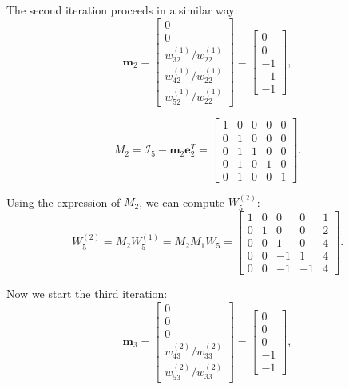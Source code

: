 \documentclass[a4paper,11pt]{article}
\begin{document}
The second iteration proceeds in a similar way:
\begin{equation}\label{key}
	\textbf{m}_2 = 
	\begin{bmatrix}
		0\\
		0\\
		{w^{(1)}_{32}}/{w^{(1)}_{22}}\\
		{w^{(1)}_{42}}/{w^{(1)}_{22}}\\
		{w^{(1)}_{52}}/{w^{(1)}_{22}}
	\end{bmatrix}=
	\begin{bmatrix}
		0\\
		0\\
		-1\\
		-1\\
		-1
	\end{bmatrix},
\end{equation}

\begin{equation}\label{key}
	M_2=\mathcal{I}_5 - \textbf{m}_2\textbf{e}_2^T =
	\begin{bmatrix}
		1 & 0  & 0  & 0  & 0  \\
		0 & 1 & 0 & 0 & 0\\
		0 & 1 & 1 & 0 & 0 \\
		0 & 1 & 0 & 1 & 0 \\
		0 & 1 & 0 & 0 & 1 
	\end{bmatrix}.
\end{equation}

\noindent Using the expression of $M_2$, we can compute $W_5^{(2)}$:
\begin{equation}\label{key}
	W_5^{(2)} = M_2 W_5^{(1)} = M_2 M_1 W_5 =
	\begin{bmatrix}
		1 & 0  & 0  & 0  & 1  \\
		0 & 1 & 0 & 0 & 2 \\
		0 & 0 & 1 & 0 & 4 \\
		0 & 0 & -1 & 1 & 4 \\
		0 & 0 & -1 & -1 & 4 
	\end{bmatrix}.
\end{equation}

\noindent Now we start the third iteration:
\begin{equation}\label{key}
	\textbf{m}_3 = 
	\begin{bmatrix}
		0\\
		0\\
		0\\
		{w^{(2)}_{43}}/{w^{(2)}_{33}}\\
		{w^{(2)}_{53}}/{w^{(2)}_{33}}
	\end{bmatrix}=
	\begin{bmatrix}
		0\\
		0\\
		0\\
		-1\\
		-1
	\end{bmatrix},
\end{equation}
\end{document}
